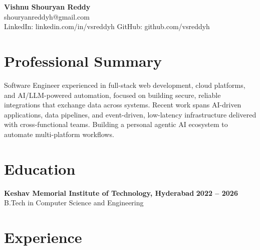 \documentclass[a4paper,11pt]{article}
\newcommand{\resumeSubheading}[4]{%
  \textbf{#1} \hfill \textbf{#2} \\
{#3} \hfill {#4}
}
\begin{document}
\pagestyle{empty}
\raggedbottom
\addtolength{\textheight}{2\baselineskip}
\small

\begin{center}
  {\LARGE \textbf{Vishnu Shouryan Reddy}}\\[0.3em]
  shouryanreddyh@gmail.com \\[0.3em]
  LinkedIn: linkedin.com/in/vsreddyh \textbar{} GitHub: github.com/vsreddyh
\end{center}
\vspace{-0.8em}

\section*{Professional Summary}

Software Engineer experienced in full-stack web development, cloud platforms, and AI/LLM-powered automation, focused on building secure, reliable integrations that exchange data across systems. Recent work spans AI-driven applications, data pipelines, and event-driven, low-latency infrastructure delivered with cross-functional teams. Building a personal agentic AI ecosystem to automate multi-platform workflows.

\section*{Education}

\resumeSubheading
{Keshav Memorial Institute of Technology, Hyderabad}{2022 -- 2026}
{B.Tech in Computer Science and Engineering}{}


\section*{Experience}
\end{document}
